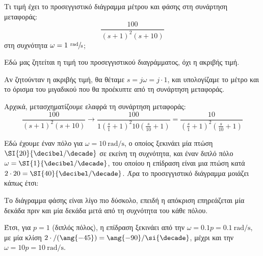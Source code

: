 \documentclass[11pt,a4paper,notitlepage,fleqn,final]{article}
\begin{document}
\begin{exercise}
Τι τιμή έχει το προσεγγιστικό διάγραμμα μέτρου και φάσης στη συνάρτηση μεταφοράς:
\[ \displaystyle \frac{100}{(s+1)^2(s+10)} \] στη συχνότητα \( \omega = 1\ \sfrac{\mathrm{rad}}{\mathrm{s}} \);
\tcblower
\begin{attnbox}{}
	Εδώ μας ζητείται η τιμή του προσεγγιστικού διαγράμματος, όχι η ακριβής τιμή.
\end{attnbox}
Αν ζητούνταν η ακριβής τιμή, θα θέταμε \( s=j\omega = j\cdot 1 \), και υπολογίζαμε το
μέτρο και το όρισμα του μιγαδικού που θα προέκυπτε από τη συνάρτηση μεταφοράς.

Αρχικά, μετασχηματίζουμε ελαφρά τη συνάρτηση μεταφοράς:
\[
\frac{100}{(s+1)^2(s+10)}
\xrightarrow{\quad}
\frac{100}{1\left(\frac{s}{1}+1\right)^2 10 \left(\frac{s}{10}+1\right)}
= \frac{10}{\left(\frac{s}{1}+1\right)^2\left(\frac{s}{10}+1\right)}
\]

Εδώ έχουμε έναν πόλο για \( \omega  = \SI{10}{\radian/\second} \), ο οποίος ξεκινάει μία
πτώση \( \SI{20}{\decibel/\decade} \) σε εκείνη τη συχνότητα, και έναν διπλό πόλο
\( \omega  = \SI{1}{\decibel/\decade} \), του οποίου η επίδραση είναι μια πτώση κατά
\( 2\cdot20 = \SI{40}{\decibel/\decade} \). Άρα το προσεγγιστικό διάγραμμα μοιάζει κάπως έτσι:


Το διάγραμμα φάσης είναι λίγο πιο δύσκολο, επειδή η απόκριση επηρεάζεται μία δεκάδα πριν
και μία δεκάδα μετά από τη συχνότητα του κάθε πόλου.

Έτσι, για \( p=1 \) (διπλός πόλος), η επίδραση ξεκινάει από την \( \omega = 0.1p =
\SI{0.1}{\radian/\second}  \), με μία κλίση \( 2\cdot/(\ang{-45}) = \ang{-90}/\si{\decade} \),
μέχρι και την \( \omega = 10p = \SI{10}{\radian/\second} \).


\end{exercise}
\end{document}
